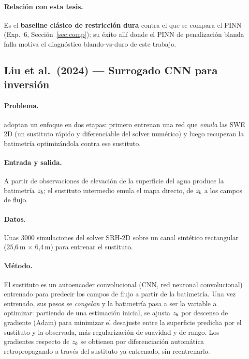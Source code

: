 \paragraph{Relación con esta tesis.}
Es el \textbf{baseline clásico de restricción dura} contra el que se compara el
PINN (Exp.\ 6, Sección~\ref{sec:comp}); su éxito allí donde el PINN de
penalización blanda falla motiva el diagnóstico blando-vs-duro de este trabajo.

\subsection{Liu et al.\ (2024) --- Surrogado CNN para inversión}
\label{sec:lit:liu}

\paragraph{Problema.}
\cite{liu2024} adoptan un enfoque en dos etapas: primero entrenan una red que
\emph{emula} las SWE 2D (un sustituto rápido y diferenciable del solver
numérico) y luego recuperan la batimetría optimizándola contra ese sustituto.

\paragraph{Entrada y salida.}
A partir de observaciones de elevación de la superficie del agua produce la
batimetría $z_b$; el sustituto intermedio emula el mapa directo, de $z_b$ a los
campos de flujo.

\paragraph{Datos.}
Unas 3000 simulaciones del solver SRH-2D sobre un canal sintético rectangular
(25,6\,m $\times$ 6,4\,m) para entrenar el sustituto.

\paragraph{Método.}
El sustituto es un autoencoder convolucional (CNN, red neuronal convolucional)
entrenado para predecir los campos de flujo a partir de la batimetría. Una vez
entrenado, sus pesos se \emph{congelan} y la batimetría pasa a ser la variable a
optimizar: partiendo de una estimación inicial, se ajusta $z_b$ por descenso de
gradiente (Adam) para minimizar el desajuste entre la superficie predicha por el
sustituto y la observada, más regularización de suavidad y de rango. Los
gradientes respecto de $z_b$ se obtienen por diferenciación automática
retropropagando a través del sustituto ya entrenado, sin reentrenarlo.

